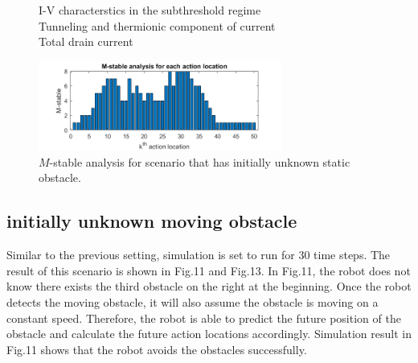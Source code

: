 \documentclass{ifacconf}
\begin{document}
\begin{figure}[htbp]
\begin{center}

\label{I_V}
\caption{I-V characterstics in the subthreshold regime\\[2ex]
\protect{} \textnormal{Tunneling and thermionic component of current}\\
\protect{} \textnormal{Total drain current}
}
\end{center}
\end{figure}


\begin{figure}[htbp]
\begin{center}
\includegraphics[width=8cm]{src/2_2_M-stable.png}
\caption{$M$-stable analysis for scenario that has initially unknown static obstacle. }
\label{fig: mpc}
\end{center}
\end{figure}

\subsection{initially unknown moving obstacle}

Similar to the previous setting, simulation is set to run for 30 time steps. The result of this scenario is shown in Fig.11 and Fig.13. In Fig.11, the robot does not know there exists the third obstacle on the right at the beginning. Once the robot detects the moving obstacle, it will also assume the obstacle is moving on a constant speed. Therefore, the robot is able to predict the future position of the obstacle and calculate the future action locations accordingly. Simulation result in Fig.11 shows that the robot avoids the obstacles successfully.
\end{document}
